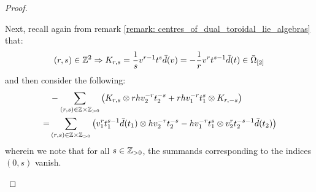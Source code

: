 \begin{proof}
\begin{enumerate}
                    Next, recall again from remark \ref{remark: centres_of_dual_toroidal_lie_algebras} that:
                        $$(r, s) \in \mathbb{Z}^2 \Rightarrow K_{r, s} = \frac1s v^{r - 1} t^s \bar{d}(v) = -\frac1r v^r t^{s - 1} \bar{d}(t) \in \bar{\Omega}_{[2]}$$
                    and then consider the following:
                        $$
                            \begin{aligned}
                                & -\sum_{(r, s) \in \Z \x \Z_{> 0}} \left( K_{r, s} \tensor r h v_2^{-r} t_2^{-s} + r h v_1^{-r} t_1^s \tensor K_{r, -s} \right)
                                \\
                                = & \sum_{(r, s) \in \Z \x \Z_{> 0}} \left( v_1^r t_1^{s - 1} \bar{d}(t_1) \tensor h v_2^{-r} t_2^{-s} - h v_1^{-r} t_1^s \tensor v_2^r t_2^{-s - 1} \bar{d}(t_2) \right)
                            \end{aligned}
                        $$
                    wherein we note that for all $s \in \mathbb{Z}_{> 0}$, the summands corresponding to the indices $(0, s)$ vanish.


\end{enumerate}
\end{proof}
